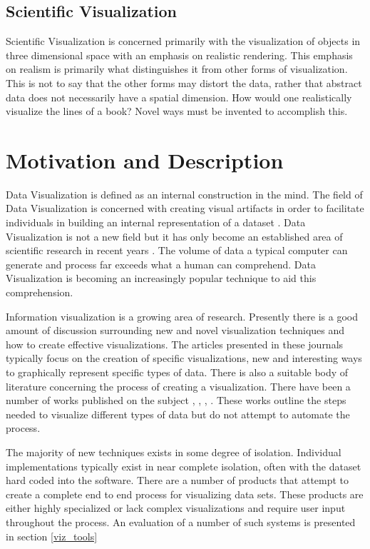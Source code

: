 \documentclass[a4paper, 11pt, titlepage, onehalfspacing]{report}
\begin{document}
\subsection{Scientific Visualization}
Scientific Visualization is concerned primarily with the visualization of objects in three dimensional space with an emphasis on realistic rendering. This emphasis on realism is primarily what distinguishes it from other forms of visualization. This is not to say that the other forms may distort the data, rather that abstract data does not necessarily have a spatial dimension. How would one realistically visualize the lines of a book? Novel ways must be invented to accomplish this.

 
\section{Motivation and Description} 

Data Visualization is defined as an internal construction in the mind. The field of Data Visualization is concerned with creating visual artifacts in order to facilitate individuals in building an internal representation of a dataset \cite{spence2001information}. Data Visualization is not a new field but it has only become an established area of scientific research in recent years \cite{friendly2001milestones}. The volume of data a typical computer can generate and process far exceeds what a human can comprehend. Data Visualization is becoming an increasingly popular technique to aid this comprehension.

Information visualization is a growing area of research. Presently there is a good amount of discussion surrounding new and novel visualization techniques and how to create effective visualizations. The articles presented in these journals typically focus on the creation of specific visualizations, new and interesting ways to graphically represent specific types of data. There is also a suitable body of literature concerning the  process of creating a visualization. There have been a number of works published on the subject \cite{mazza2009introduction}, \cite{shneiderman1996eyes}, \cite{bertin1973semiologie}, \cite{haskell1919make}. These works outline the steps needed to visualize different types of data but do not attempt to automate the process.

The majority of new techniques exists in some degree of isolation. Individual implementations typically exist in near complete isolation, often with the dataset hard coded into the software.  There are a number of products that attempt to create a complete end to end process for visualizing data sets. These products are either highly specialized or lack complex visualizations and require user input throughout the process. An evaluation of a number of such systems is presented in section \ref{viz_tools}
\end{document}
